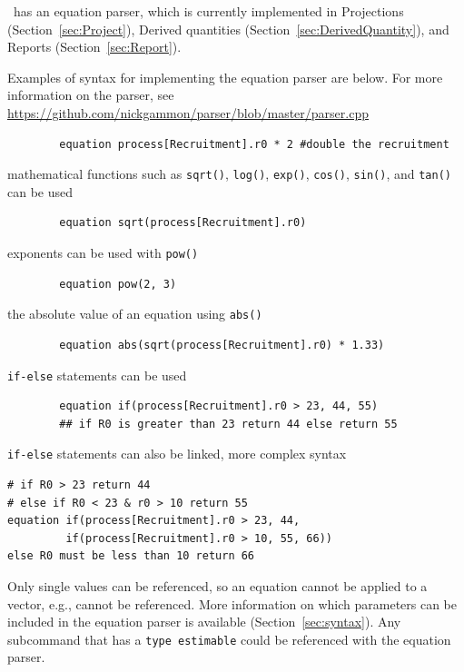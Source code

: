 \CNAME\ has an equation parser, which is currently implemented in Projections (Section~\ref{sec:Project}), Derived quantities (Section~\ref{sec:DerivedQuantity}), and Reports (Section~\ref{sec:Report}).

Examples of syntax for implementing the equation parser are below. For more information on the parser, see \url{https://github.com/nickgammon/parser/blob/master/parser.cpp}

{\small{\begin{verbatim}
		equation process[Recruitment].r0 * 2 #double the recruitment
\end{verbatim}}}

mathematical functions such as \texttt{sqrt()}, \texttt{log()},  \texttt{exp()},  \texttt{cos()}, \texttt{sin()}, and \texttt{tan()} can be used

{\small{\begin{verbatim}
		equation sqrt(process[Recruitment].r0)
\end{verbatim}}}

exponents can be used with \texttt{pow()}

{\small{\begin{verbatim}
		equation pow(2, 3)
\end{verbatim}}}

the absolute value of an equation using \texttt{abs()}

{\small{\begin{verbatim}
		equation abs(sqrt(process[Recruitment].r0) * 1.33)
\end{verbatim}}}

\texttt{if-else} statements can be used

{\small{\begin{verbatim}
		equation if(process[Recruitment].r0 > 23, 44, 55)
		## if R0 is greater than 23 return 44 else return 55
\end{verbatim}}}

\texttt{if-else} statements can also be linked, more complex syntax

{\small{\begin{verbatim}
# if R0 > 23 return 44
# else if R0 < 23 & r0 > 10 return 55
equation if(process[Recruitment].r0 > 23, 44,
         if(process[Recruitment].r0 > 10, 55, 66))
else R0 must be less than 10 return 66
\end{verbatim}}}

Only single values can be referenced, so an equation cannot be applied to a vector, e.g.,  cannot be referenced. More information on which parameters can be included in the equation parser is available (Section~\ref{sec:syntax}). Any subcommand that has a \texttt{type estimable} could be referenced with the equation parser.

